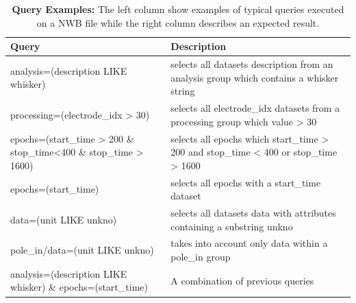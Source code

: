 \documentclass[utf8]{frontiersSCNS} %
\begin{document}
\begin{table}
\caption{\textbf{Query Examples:} The left column show examples of typical queries executed on a NWB file while the right column describes an expected result.}
\label{tab:query-examples}       %

\begin{tabular}{ |p{7.3cm}|p{9.5cm}| }
\hline
	 \textbf{Query}                                  &       \textbf{Description} \\ \hline
	
	 analysis=(description LIKE whisker)  &  selects all datasets description from an analysis group which contains a whisker string  \\ \hline
	 processing=(electrode\_idx > 30)        &  selects all electrode\_idx datasets from a processing group which value > 30   \\ \hline
	 epochs=(start\_time > 200 \& stop\_time<400 \& stop\_time > 1600)  &  selects all epochs which start\_time > 200 and stop\_time < 400 or stop\_time > 1600 \\ \hline
	 epochs=(start\_time)                     &  selects all epochs with a start\_time dataset         \\ \hline
	 data=(unit LIKE unkno)  &  selects all datasets data with attributes containing a substring unkno \\ \hline
	 pole\_in/data=(unit LIKE unkno)  &  takes into account only data within a pole\_in group \\ \hline
	 analysis=(description LIKE whisker) \& epochs=(start\_time)   &  A combination of previous queries \\ \hline

\end{tabular}

\end{table}
\end{document}
